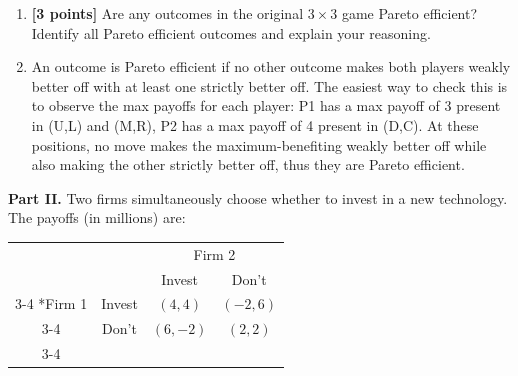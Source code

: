 \documentclass[11pt]{article}
\begin{document}
\begin{enumerate}[label=(\alph*)]
    
    \item \textbf{[3 points]} Are any outcomes in the original $3 \times 3$ game Pareto efficient? Identify all Pareto efficient outcomes and explain your reasoning.
        \item[] An outcome is Pareto efficient if no other outcome makes both players weakly better off with at least one strictly better off. The easiest way to check this is to observe the max payoffs for each player: P1 has a max payoff of 3 present in (U,L) and (M,R), P2 has a max payoff of 4 present in (D,C). At these positions, no move makes the maximum-benefiting weakly better off while also making the other strictly better off, thus they are Pareto efficient.

\end{enumerate}

\textbf{Part II.} Two firms simultaneously choose whether to invest in a new technology. The payoffs (in millions) are:

\begin{center}
\begin{tabular}{cc|c|c|}
 & \multicolumn{1}{c}{} & \multicolumn{2}{c}{Firm 2}\\
 & \multicolumn{1}{c}{} & \multicolumn{1}{c}{Invest} & \multicolumn{1}{c}{Don't} \\\cline{3-4}
\multirow{2}*{Firm 1} & Invest & $(4, 4)$ & $(-2, 6)$ \\\cline{3-4}
 & Don't & $(6, -2)$ & $(2, 2)$ \\\cline{3-4}
\end{tabular}
\end{center}
\end{document}
